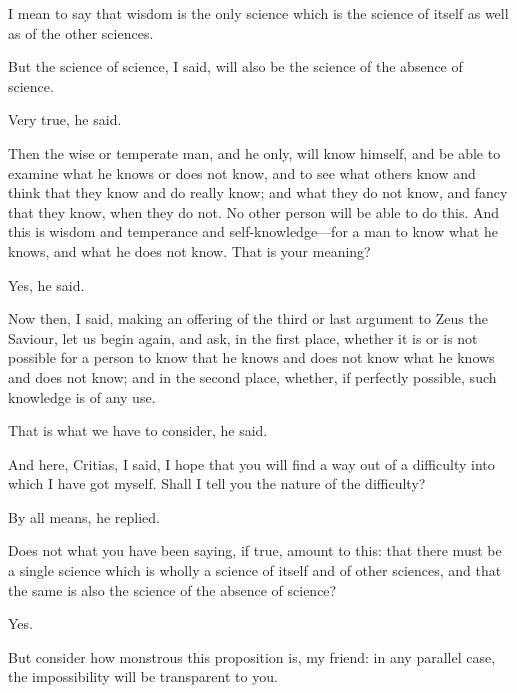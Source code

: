 \documentclass[11pt,letter]{article}
\begin{document}
\par  I mean to say that wisdom is the only science which is the science of itself as well as of the other sciences.

\par  But the science of science, I said, will also be the science of the absence of science.

\par  Very true, he said.

\par  Then the wise or temperate man, and he only, will know himself, and be able to examine what he knows or does not know, and to see what others know and think that they know and do really know; and what they do not know, and fancy that they know, when they do not. No other person will be able to do this. And this is wisdom and temperance and self-knowledge—for a man to know what he knows, and what he does not know. That is your meaning?

\par  Yes, he said.

\par  Now then, I said, making an offering of the third or last argument to Zeus the Saviour, let us begin again, and ask, in the first place, whether it is or is not possible for a person to know that he knows and does not know what he knows and does not know; and in the second place, whether, if perfectly possible, such knowledge is of any use.

\par  That is what we have to consider, he said.

\par  And here, Critias, I said, I hope that you will find a way out of a difficulty into which I have got myself. Shall I tell you the nature of the difficulty?

\par  By all means, he replied.

\par  Does not what you have been saying, if true, amount to this: that there must be a single science which is wholly a science of itself and of other sciences, and that the same is also the science of the absence of science?

\par  Yes.

\par  But consider how monstrous this proposition is, my friend: in any parallel case, the impossibility will be transparent to you.
\end{document}
